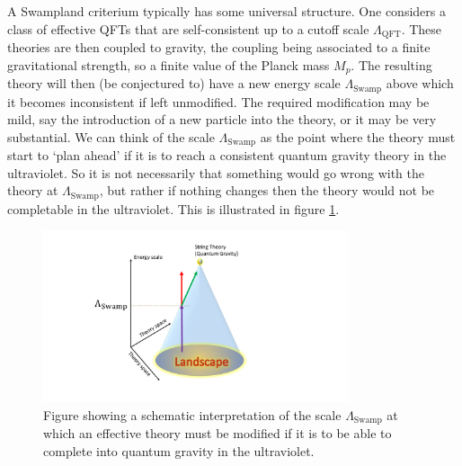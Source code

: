\documentclass[11pt,a4paper]{article}
\numberwithin{equation}{section}
\numberwithin{table}{section}\setlength{\multlinegap}{25pt}
\begin{document}
A Swampland criterium typically has some universal structure. One considers a class of effective QFTs that are self-consistent up to a cutoff scale $\Lambda_{\mathrm{QFT}}$. These theories are then coupled to gravity, the coupling being associated to a finite gravitational strength, so a finite value of the Planck mass $M_p$. The resulting theory will then (be conjectured to) have a new energy scale $\Lambda_{\mathrm{Swamp}}$ above which it becomes inconsistent if left unmodified. The required modification may be mild, say the introduction of a new particle into the theory, or it may be very substantial. We can think of the scale $\Lambda_{\mathrm{Swamp}}$ as the point where the theory must start to `plan ahead' if it is to reach a consistent quantum gravity theory in the ultraviolet. So it is not necessarily that something would go wrong with the theory at $\Lambda_{\mathrm{Swamp}}$, but rather if nothing changes then the theory would not be completable in the ultraviolet. This is illustrated in figure \ref{fig:swcone}. 
\begin{figure}[t]
\centering
 \includegraphics[width=0.8\textwidth]{SwCone.pdf}
\caption{Figure showing a schematic interpretation of the scale $\Lambda_{\mathrm{Swamp}}$ at which an effective theory must be modified if it is to be able to complete into quantum gravity in the ultraviolet.}
\label{fig:swcone}
\end{figure}
\end{document}
